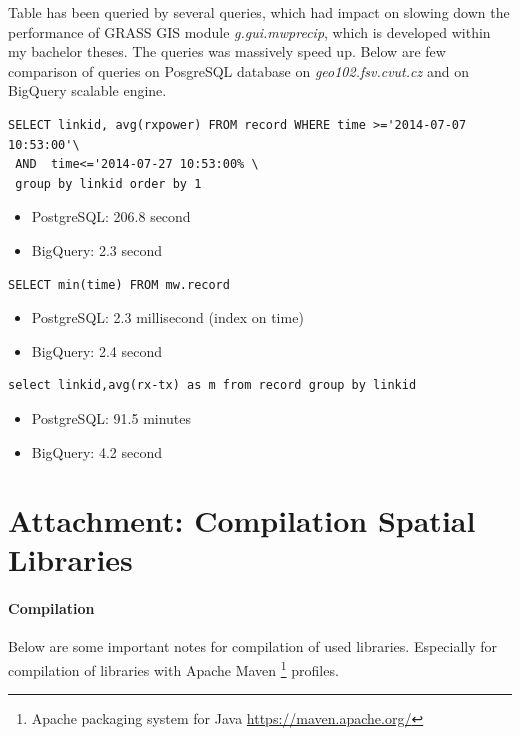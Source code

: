 \documentclass[a4paper,12pt,oneside]{report}
\begin{document}
		Table has been queried by several queries, which had impact on slowing down
the performance of GRASS GIS module \textit{g.gui.mwprecip}, which is developed
within my bachelor theses. The queries was massively speed up. Below are few
comparison of queries on PosgreSQL database on \textit{geo102.fsv.cvut.cz} and
on BigQuery scalable engine.
	\begin{footnotesize}
		\begin{lstlisting}[style=python]
SELECT linkid, avg(rxpower) FROM record WHERE time >='2014-07-07 10:53:00'\
 AND  time<='2014-07-27 10:53:00% \
 group by linkid order by 1
		\end{lstlisting}
	\end{footnotesize}
\begin{itemize}
\item PostgreSQL: 206.8 second
\item BigQuery: 2.3 second
\end{itemize}
	\begin{footnotesize}
		\begin{lstlisting}[style=python]
SELECT min(time) FROM mw.record
		\end{lstlisting}
	\end{footnotesize}
\begin{itemize}
\item PostgreSQL: 2.3 millisecond (index on time)
\item BigQuery: 2.4 second
\end{itemize}
	\begin{footnotesize}
		\begin{lstlisting}[style=python]
select linkid,avg(rx-tx) as m from record group by linkid
		\end{lstlisting}
	\end{footnotesize}
\begin{itemize}
\item PostgreSQL: 91.5 minutes
\item BigQuery: 4.2 second
\end{itemize}
	

\newpage
\section{Attachment: Compilation Spatial Libraries}
\label{att:java}
	\paragraph{Compilation} Below are some important notes for compilation of used
	libraries. Especially for compilation of libraries with Apache
Maven \footnote{Apache packaging system for Java \url{https://maven.apache.org/}}
profiles.
	
\end{document}
